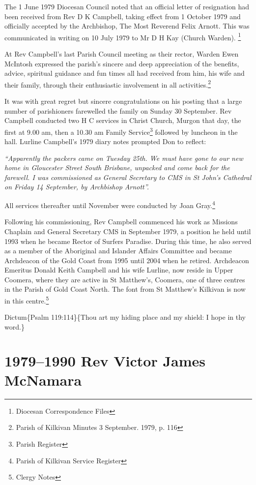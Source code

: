 The 1 June 1979 Diocesan Council noted that an official letter of resignation had been received from Rev D K Campbell, taking effect from 1 October 1979 and officially accepted by the Archbishop, The Most Reverend Felix Arnott. This was communicated in writing on 10 July 1979 to Mr D H Kay (Church Warden). \footnote{Diocesan Correspondence Files}

At Rev Campbell's last Parish Council meeting as their rector, Warden Ewen McIntosh expressed the parish's sincere and deep appreciation of the benefits, advice, spiritual guidance and fun times all had received from him, his wife and their family, through their enthusiastic involvement in all activities.\footnote{Parish of Kilkivan Minutes 3 September. 1979, p. 116}

It was with great regret but sincere congratulations on his posting that a large number of parishioners farewelled the family on Sunday 30 September. Rev Campbell conducted two H C services in Christ Church, Murgon that day, the first at 9.00 am, then a 10.30 am Family Service\footnote{Parish Register} followed by luncheon in the hall. Lurline Campbell's 1979 diary notes prompted Don to reflect:

\emph{``Apparently the packers came on Tuesday 25th. We must have gone to our new home in Gloucester Street South Brisbane, unpacked and come back for the farewell. I was commissioned as General Secretary to CMS in St John's Cathedral on Friday 14 September, by Archbishop Arnott''.}

All services thereafter until November were conducted by Joan Gray.\footnote{Parish of Kilkivan Service Register}

Following his commissioning, Rev Campbell commenced his work as Missions Chaplain and General Secretary CMS in September 1979, a position he held until 1993 when he became Rector of Surfers Paradise. During this time, he also served as a member of the Aboriginal and Islander Affairs Committee and became Archdeacon of the Gold Coast from 1995 until 2004 when he retired. Archdeacon Emeritus Donald Keith Campbell and his wife Lurline, now reside in Upper Coomera, where they are active in St Matthew's, Coomera, one of three centres in the Parish of Gold Coast North. The font from St Matthew's Kilkivan is now in this centre.\footnote{Clergy Notes}

Dictum\{Psalm 119:114\}\{Thou art my hiding place and my shield: I hope in thy word.\}

\hypertarget{rev-victor-james-mcnamara}{%
\chapter{1979--1990 Rev Victor James McNamara}\label{rev-victor-james-mcnamara}}

